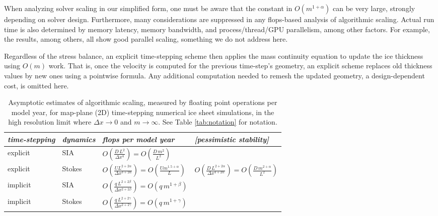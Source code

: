\documentclass[review,letterpaper]{igs}
\begin{document}
When analyzing solver scaling in our simplified form, one must be aware that the constant in $O(m^{1+\alpha})$ can be very large, strongly depending on solver design.  Furthermore, many considerations are suppressed in any flops-based analysis of algorithmic scaling.  Actual run time is also determined by memory latency, memory bandwidth, and process/thread/GPU parallelism, among other factors.  For example, the \cite{BrownSmithAhmadia2013,Fischleretal2022,IsaacStadlerGhattas2015,Lengetal2012,Tuminaroetal2016} results, among others, all show good parallel scaling, something we do not address here.

Regardless of the stress balance, an explicit time-stepping scheme then applies the mass continuity equation to update the ice thickness using $O(m)$ work.  That is, once the velocity is computed for the previous time-step's geometry, an explicit scheme replaces old thickness values by new ones using a pointwise formula.  Any additional computation needed to remesh the updated geometry, a design-dependent cost, is omitted here.

\newcommand{\oo}[1]{\displaystyle O\left(#1\right)}
\setlength{\tabcolsep}{5pt}
\renewcommand{\arraystretch}{1.5}
\begin{table*}[ht]
{\normalsize
\begin{tabular}{llll}
\emph{time-stepping} & \emph{dynamics} & \emph{flops per model year} & \emph{[pessimistic stability]} \\ \hline
explicit & SIA    & $\oo{\frac{D\, L^2}{\Delta x^4}} = \oo{\frac{D\, m^2}{L^2}}${\Huge \strut} \\
explicit & Stokes & $\oo{\frac{U L^{2+2\alpha}}{\Delta x^{3+2\alpha}}} = \oo{\frac{U m^{1.5+\alpha}}{L}}${\Huge \strut}\phantom{x} & $\oo{\frac{D\, L^{2+2\alpha}}{\Delta x^{4+2\alpha}}} = \oo{\frac{D\,m^{2+\alpha}}{L^2}}$ \\
implicit & SIA    & $\oo{\frac{q\, L^{2+2\beta}}{\Delta x^{2+2\beta}}} = \oo{q\, m^{1+\beta}}${\Huge \strut} \\
implicit & Stokes & $\oo{\frac{q\, L^{2+2\gamma}}{\Delta x^{2+2\gamma}}} = \oo{q\, m^{1+\gamma}}${\Huge \strut}
\end{tabular}
}
\caption{Asymptotic estimates of algorithmic scaling, measured by floating point operations per model year, for map-plane (2D) time-stepping numerical ice sheet simulations, in the high resolution limit where $\Delta x\to 0$ and $m\to\infty$.  See Table \ref{tab:notation} for notation.}
\label{tab:performancemodel}
\end{table*}
\end{document}
